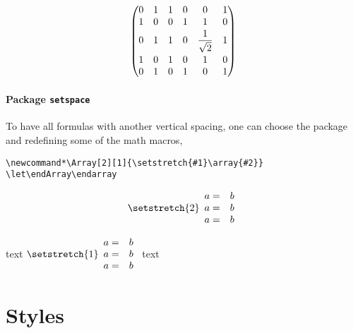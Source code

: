 \begin{table}[htb]
\begin{LTXexample}[width=0.4\linewidth]
\[
\begin{pmatrix}
0 & 1 & 1 & 0 & 0 & 1 \\
1 & 0 & 0 & 1 & 1 & 0 \\
\noalign{\vskip2pt}
0 & 1 & 1 & 0 & \dfrac{1}{\sqrt{2}} & 1\\
\noalign{\vskip2pt}
1 & 0 & 1 & 0 & 1 & 0 \\
0 & 1 & 0 & 1 & 0 & 1 \\
\end{pmatrix}
\]
\end{LTXexample}



\paragraph{Package \texttt{setspace}}
To have all formulas with another vertical spacing, one can choose
the package  and redefining some of the math macros, \eg

\begingroup
\newcommand*\Array[2][1]{\setstretch{#1}\array{#2}}
\let\endArray\endarray

\begin{lstlisting}
\newcommand*\Array[2][1]{\setstretch{#1}\array{#2}}
\let\endArray\endarray
\end{lstlisting}

\begin{LTXexample}[width=0.25\linewidth]
\[
\begin{Array}[2]{cc}
a =&b\\
a =&b\\
a =&b
\end{Array}
\]

text $\begin{Array}{cc}
a =&b\\
a =&b\\
a =&b
\end{Array}$ text
\end{LTXexample}
\endgroup

\section{Styles}\label{sec:Styles}


\end{table}
